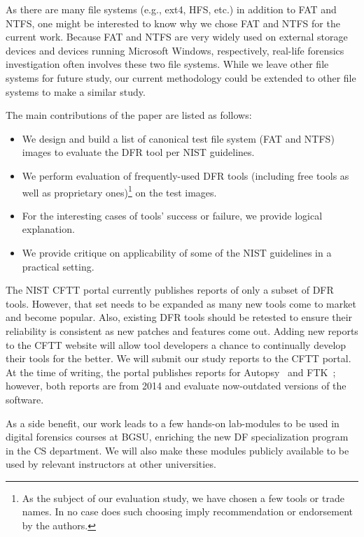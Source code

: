 \documentclass{ws-rv9x6}
\newenvironment{paraphrase}{\color{blue}}{\color{black}} %
\begin{document}
\begin{paraphrase}
As there are many file systems (e.g., ext4, HFS, etc.) in addition to FAT and NTFS, one might be interested to know why we chose FAT and NTFS for the current work. 
Because FAT and NTFS are very widely used on external storage devices and devices running Microsoft Windows, respectively,
real-life forensics investigation often involves these two file systems.
While we leave other file systems for future study, our current methodology could be 
extended to other file systems to make a similar study.

The main contributions of the paper are listed as follows:
\begin{itemize}
\item We design and build a list of canonical test file system (FAT and NTFS) images to evaluate the DFR tool per NIST guidelines. 
\item We perform evaluation of frequently-used DFR tools (including free tools as well as proprietary ones)\footnote{As the subject of our evaluation study, 
we have chosen a few tools or trade names. In no case does such choosing imply recommendation or endorsement by the authors.} on the test images.
\item For the interesting cases of tools' success or failure, we provide logical explanation.
\item We provide critique on applicability of some of the NIST guidelines in a practical setting. 
\end{itemize}


The NIST CFTT portal currently publishes reports of only a subset of DFR tools. 
However, that set needs to be expanded as many new tools come to market and become popular.
Also, existing DFR tools should be retested to ensure their reliability is consistent 
as new patches and features come out. 
Adding new reports to the CFTT website will allow tool developers a 
chance to continually develop their tools for the better. We will submit our study reports to the CFTT portal.
At the time of writing, the portal publishes reports for Autopsy~\cite{dhs:autopsy} and FTK~\cite{dhs:ftk}; 
however, both reports are from 2014 and evaluate now-outdated versions of the software.

As a side benefit, our work leads to a few hands-on lab-modules to be used in digital forensics courses 
at BGSU, enriching the new DF specialization program in the CS department. We will also make these modules
publicly available to be used by relevant instructors at other universities.

\end{paraphrase}
\end{document}
